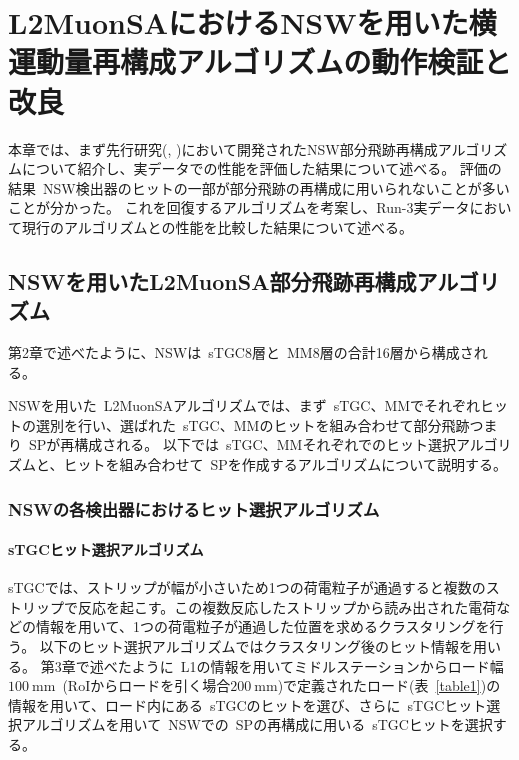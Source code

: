 \chapter{L2MuonSAにおけるNSWを用いた横運動量再構成アルゴリズムの動作検証と改良}\label{chapter5}


本章では、まず先行研究(\cite{article:kumaoka}, \cite{article:noguchi})において開発されたNSW部分飛跡再構成アルゴリズムについて紹介し、実データでの性能を評価した結果について述べる。
評価の結果~NSW検出器のヒットの一部が部分飛跡の再構成に用いられないことが多いことが分かった。
これを回復するアルゴリズムを考案し、Run-3実データにおいて現行のアルゴリズムとの性能を比較した結果について述べる。


\section{NSWを用いたL2MuonSA部分飛跡再構成アルゴリズム}\label{chapter5-1}
第2章で述べたように、NSWは~sTGC8層と~MM8層の合計16層から構成される。

NSWを用いた~L2MuonSAアルゴリズムでは、まず~sTGC、MMでそれぞれヒットの選別を行い、選ばれた~sTGC、MMのヒットを組み合わせて部分飛跡つまり~SPが再構成される。
以下では~sTGC、MMそれぞれでのヒット選択アルゴリズムと、ヒットを組み合わせて~SPを作成するアルゴリズムについて説明する。

\subsection{NSWの各検出器におけるヒット選択アルゴリズム}\label{chapter5-1-1}
\subsubsection{sTGCヒット選択アルゴリズム}
sTGCでは、ストリップが幅が小さいため1つの荷電粒子が通過すると複数のストリップで反応を起こす。この複数反応したストリップから読み出された電荷などの情報を用いて、1つの荷電粒子が通過した位置を求めるクラスタリングを行う。
以下のヒット選択アルゴリズムではクラスタリング後のヒット情報を用いる。
第3章で述べたように~L1の情報を用いてミドルステーションからロード幅~$\SI{100}{\mm}$~(RoIからロードを引く場合$\SI{200}{\mm}$)で定義されたロード(表~\ref{table1})の情報を用いて、ロード内にある~sTGCのヒットを選び、さらに~sTGCヒット選択アルゴリズムを用いて~NSWでの~SPの再構成に用いる~sTGCヒットを選択する。

